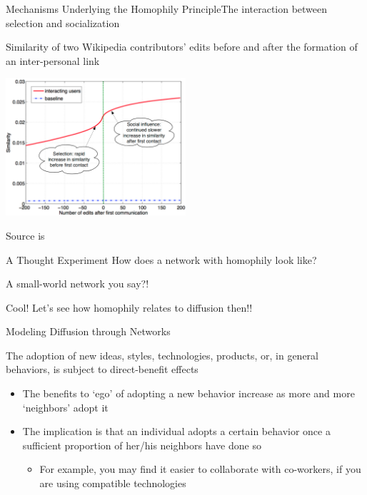 \documentclass[notes, aspectratio=1610]{beamer}
\begin{document}
\begin{frame}{Mechanisms Underlying the Homophily Principle}{The interaction 
	between selection and socialization}
	\centering 

	\small Similarity of two Wikipedia contributors' edits before and after 
	the formation of an inter-personal link

	\includegraphics[width=0.5\textwidth]{images/selection_and_socialization.png}

	\footnotesize Source is \cite{easley2010}
\end{frame}

\begin{frame}{A Thought Experiment}{}
	\centering
	\Large
	How does a network with homophily look like?

	\pause 

	\vspace{2em}

	A small-world network you say?!

	\vspace{2em}

	\pause

	Cool! Let's see how homophily relates to diffusion then!!
\end{frame}

\begin{frame}{Modeling Diffusion through Networks}{}
	
	The adoption of new ideas, styles, technologies, products, or, in 
	general behaviors, is subject to direct-benefit effects
	
	\begin{itemize}
		\item 
		The benefits to `ego' of adopting a new behavior increase as 
		more and more `neighbors' adopt it
		\item 
		The implication is that an individual adopts a certain 
		behavior once a sufficient proportion of her/his neighbors 
		have done so
		\begin{itemize}
			\item 
			For example, you may find it easier to collaborate 
			with co-workers, if you are using compatible technologies
		\end{itemize}
	\end{itemize}

\end{frame}
\end{document}
